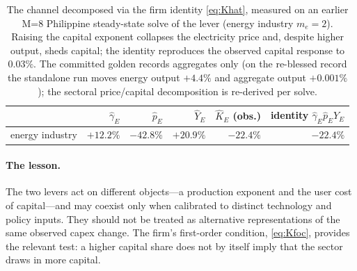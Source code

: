 \begin{table}[t]
\centering\footnotesize
\caption{The  channel decomposed via the firm identity
\cref{eq:Khat}, measured on an earlier M=8 Philippine steady-state solve of the lever
(energy industry $m_e=2$). Raising
the capital exponent collapses the electricity price and, despite higher output, sheds
capital; the identity reproduces the observed capital response to $0.03\%$. The committed
golden records aggregates only (on the re-blessed record the standalone run moves energy
output $+4.4\%$ and aggregate output $+0.001\%$); the sectoral price/capital
decomposition is re-derived per solve.}
\label{tab:capital-pair}
\begin{tabular}{@{}lrrrrr@{}}
\toprule
 & $\hat\gamma_E$ & $\hat p_E$ & $\hat Y_E$ & $\hat K_E$ (obs.) & identity $\hat\gamma_E\hat p_E\hat Y_E$ \\
\midrule
energy industry & $+12.2\%$ & $-42.8\%$ & $+20.9\%$ & $-22.4\%$ & $-22.4\%$ \\
\bottomrule
\end{tabular}
\end{table}

\paragraph{The lesson.}
The two levers act on different objects---a production exponent and the user cost of
capital---and may coexist only when calibrated to distinct technology and policy inputs.
They should not be treated as alternative representations of the same observed capex
change. The firm's first-order condition, \cref{eq:Kfoc}, provides the relevant test: a
higher capital share does not by itself imply that the sector draws in more capital.

